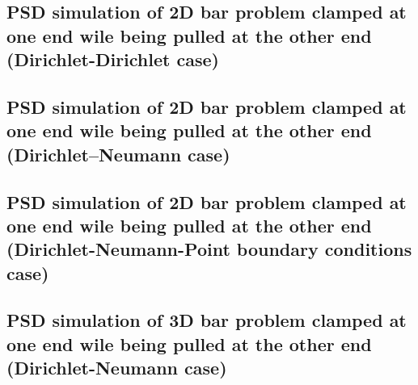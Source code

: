 \subsection{PSD simulation of 2D bar problem clamped at one end wile being pulled at the other end (Dirichlet-Dirichlet case)\label{sec:2d-bar-clamped2}}

{
	\renewcommand{\subsection}{\subsubsection}
	
}



\subsection{PSD simulation of 2D bar problem clamped at one end wile being pulled at the other end (Dirichlet--Neumann case)\label{sec:2d-bar-clamped3}}

{
	\renewcommand{\subsection}{\subsubsection}
	
}
 

\subsection{PSD simulation of 2D bar problem clamped at one end wile being pulled at the other end (Dirichlet-Neumann-Point boundary conditions case)\label{sec:2d-bar-clamped4}}


{
	\renewcommand{\subsection}{\subsubsection}
	
}


\subsection{PSD simulation of 3D bar problem clamped at one end wile being pulled at the other end (Dirichlet-Neumann case)\label{sec:3d-bar-clamped3}}

